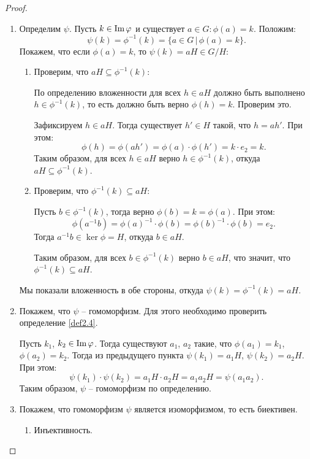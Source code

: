 \begin{proof}~
    \begin{enumerate}
        \item Определим $\psi$. Пусть $k \in \operatorname{Im} \varphi$ и существует $a \in G: \phi(a) = k$. Положим: 
        $$\psi(k) = \phi^{-1}(k) = \{a \in G \, | \, \phi(a) = k\}.$$
        Покажем, что если $\phi(a) = k$, то $\psi(k) = aH \in G/H$:
        \begin{enumerate}
            \item Проверим, что $aH \subseteq \phi^{-1}(k)$:
            
            По определению вложенности для всех $h \in aH$ должно быть выполнено $h \in \phi^{-1}(k)$, 
            то есть должно быть верно $\phi(h) = k$. Проверим это. 
            
            Зафиксируем $h \in aH$. Тогда существует $h' \in H$ такой, что $h = ah'$. При этом:
            $$\phi(h) = \phi(ah') = \phi(a) \cdot \phi(h') = k \cdot e_2 = k.$$
            Таким образом, для всех $h \in aH$ верно $h \in \phi^{-1}(k)$, откуда $aH \subseteq \phi^{-1}(k)$.

            \item Проверим, что $\phi^{-1}(k) \subseteq aH$:
            
            Пусть $b \in \phi^{-1}(k)$, тогда верно $\phi(b) = k = \phi(a)$. 
            При этом: $$\phi(a^{-1}b) = \phi(a)^{-1} \cdot \phi(b) = \phi(b)^{-1} \cdot \phi(b) = e_2.$$ 
            Тогда $a^{-1}b \in \ker \phi = H$, откуда $b \in aH$. 
            
            Таким образом, для всех $b \in \phi^{-1}(k)$
            верно $b \in aH$, что значит, что $\phi^{-1}(k) \subseteq aH$.
        \end{enumerate}
        Мы показали вложенность в обе стороны, откуда $\psi(k) = \phi^{-1}(k) = aH$.
        \item Покажем, что $\psi$ -- гомоморфизм. Для этого необходимо проверить определение \ref{def2.4}.
        
        Пусть $k_1$, $k_2 \in \operatorname{Im} \varphi$. Тогда существуют $a_1$, $a_2$ такие, что $\phi(a_1) = k_1$, 
        $\phi(a_2) = k_2$. Тогда из предыдущего пункта $\psi(k_1) = a_1 H$, $\psi(k_2) = a_2 H$. При этом:
        $$\psi(k_1) \cdot \psi(k_2) = a_1 H \cdot a_2 H = a_1 a_2 H = \psi(a_1 a_2).$$
        Таким образом, $\psi$ -- гомоморфизм по определению.
        \item Покажем, что гомоморфизм $\psi$ является изоморфизмом, то есть биективен.
        \begin{enumerate}
            \item Инъективность.
            

\end{enumerate}
\end{enumerate}
\end{proof}
